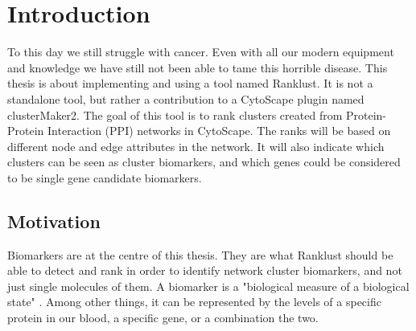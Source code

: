 \part{Introduction}
\label{pa:intro}
To this day we still struggle with cancer. Even with all our modern equipment
and knowledge we have still not been able to tame this horrible disease. This
thesis is about implementing and using a tool named Ranklust. It is not a
standalone tool, but rather a contribution to a CytoScape plugin named
clusterMaker2\cite{cm2}\cite{cm2-github}. The goal of this tool is to rank
clusters created from Protein-Protein Interaction (PPI) networks in CytoScape.
The ranks will be based on different node and edge attributes in the network.
It will also indicate which clusters can be seen as cluster biomarkers, and
which genes could be considered to be single gene candidate biomarkers.

\chapter{Motivation}
Biomarkers are at the centre of this thesis. They are what Ranklust should be
able to detect and rank in order to identify network cluster biomarkers, and not
just single molecules of them. A biomarker is a "biological measure of a
biological state" \cite{biomarker1}. Among other things, it can be represented
by the levels of a specific protein in our blood, a specific gene, or a
combination the two.

